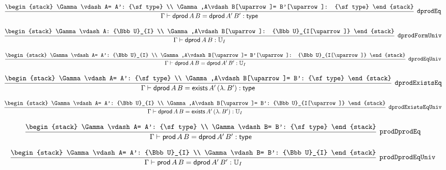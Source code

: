 \[
\infer[{\tt dprodEq}]{\Gamma \vdash {\sf dprod}\,A\,B= {\sf dprod}\,A'\,B': {\sf type}}{
\begin{stack}
\Gamma \vdash A= A': {\sf type}
\\
\Gamma ,A\vdash B[\uparrow ]= B'[\uparrow ]: {\sf type}
\end{stack}}
\]

\[
\infer[{\tt dprodFormUniv}]{\Gamma \vdash {\sf dprod}\,A\,B: {\Bbb U}_{I}}{
\begin{stack}
\Gamma \vdash A: {\Bbb U}_{I}
\\
\Gamma ,A\vdash B[\uparrow ]: {\Bbb U}_{I[\uparrow ]}
\end{stack}}
\]

\[
\infer[{\tt dprodEqUniv}]{\Gamma \vdash {\sf dprod}\,A\,B= {\sf dprod}\,A'\,B': {\Bbb U}_{I}}{
\begin{stack}
\Gamma \vdash A= A': {\Bbb U}_{I}
\\
\Gamma ,A\vdash B[\uparrow ]= B'[\uparrow ]: {\Bbb U}_{I[\uparrow ]}
\end{stack}}
\]

\[
\infer[{\tt dprodExistsEq}]{\Gamma \vdash {\sf dprod}\,A\,B= {\sf exists}\,A'\,(\lambda .\,B'): {\sf type}}{
\begin{stack}
\Gamma \vdash A= A': {\sf type}
\\
\Gamma ,A\vdash B[\uparrow ]= B': {\sf type}
\end{stack}}
\]

\[
\infer[{\tt dprodExistsEqUniv}]{\Gamma \vdash {\sf dprod}\,A\,B= {\sf exists}\,A'\,(\lambda .\,B'): {\Bbb U}_{I}}{
\begin{stack}
\Gamma \vdash A= A': {\Bbb U}_{I}
\\
\Gamma ,A\vdash B[\uparrow ]= B': {\Bbb U}_{I[\uparrow ]}
\end{stack}}
\]

\[
\infer[{\tt prodDprodEq}]{\Gamma \vdash {\sf prod}\,A\,B= {\sf dprod}\,A'\,B': {\sf type}}{
\begin{stack}
\Gamma \vdash A= A': {\sf type}
\\
\Gamma \vdash B= B': {\sf type}
\end{stack}}
\]

\[
\infer[{\tt prodDprodEqUniv}]{\Gamma \vdash {\sf prod}\,A\,B= {\sf dprod}\,A'\,B': {\Bbb U}_{I}}{
\begin{stack}
\Gamma \vdash A= A': {\Bbb U}_{I}
\\
\Gamma \vdash B= B': {\Bbb U}_{I}
\end{stack}}
\]

